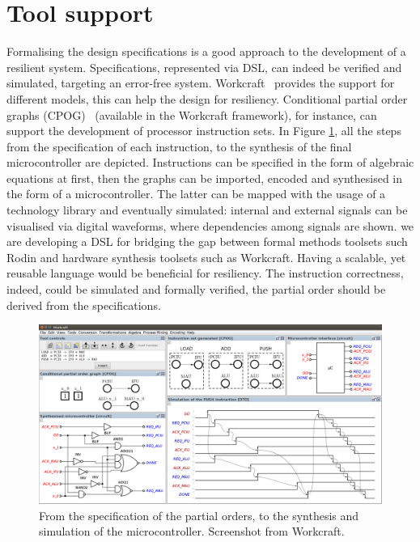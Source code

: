 \documentclass[conference]{IEEEtran}
\begin{document}
\section{Tool support}

Formalising the design specifications is a good approach to the development of a resilient
system. Specifications, represented via DSL, can indeed be verified and
simulated, targeting an error-free system. Workcraft~\cite{workcraft_web} provides the support for different
models, this can help the design for resiliency. Conditional partial order graphs (CPOG)~\cite{CPOG}
(available in the Workcraft framework), for instance, can support the development of
processor instruction sets. In Figure \ref{fig:screenshot}, all the steps from the
specification of each instruction, to the synthesis of the final microcontroller are
depicted. Instructions can be specified in the form of algebraic equations at first, then the
graphs can be imported, encoded and synthesised in the form of a microcontroller. The latter
can be mapped with the usage of a technology library and eventually simulated: internal and
external signals can be visualised via digital waveforms, where dependencies among signals
are shown. we are developing a DSL for bridging the gap between formal methods toolsets such
Rodin and hardware synthesis toolsets such as Workcraft. Having a scalable, yet
reusable language would be beneficial for resiliency. The instruction correctness, indeed,
could be simulated and formally verified, the partial order should be derived from the
specifications.

\begin{figure}[ht!]
\begin{center}
	\includegraphics[width=\linewidth]{FIG/screen.png}
	\caption{From the specification of the partial orders, to the synthesis and simulation
	of the microcontroller. Screenshot from Workcraft.}
	\label{fig:screenshot}
\end{center}
\end{figure}
\end{document}
